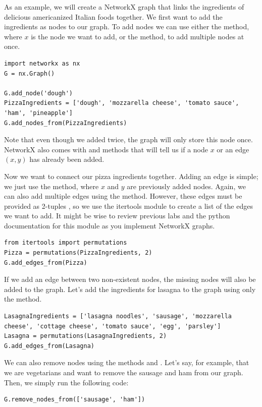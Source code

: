 As an example, we will create a NetworkX graph that links the ingredients of
delicious americanized Italian foods together. We first want to add the ingredients as nodes
to our graph. To add nodes we can use either the  method, where $x$
is the node we want to add, or the  method, to
add multiple nodes at once.

\begin{lstlisting}
import networkx as nx
G = nx.Graph()

G.add_node('dough')
PizzaIngredients = ['dough', 'mozzarella cheese', 'tomato sauce', 'ham', 'pineapple']
G.add_nodes_from(PizzaIngredients)
\end{lstlisting}
Note that even though we added  twice, the graph will only store this node once. NetworkX also comes with  and  methods that will tell
us if a node $x$ or an edge $(x,y)$ has already been added.

Now we want to connect our pizza ingredients together. Adding an edge is simple; we just use the  method, where $x$ and $y$ are previously added nodes.
Again, we can also add multiple edges using the  method.
However, these edges must be provided as 2-tuples , so we use the
itertools module to create a list of the edges we want to add. It might be wise
to review previous labs and the python documentation for this module as you implement
NetworkX graphs.

\begin{lstlisting}
from itertools import permutations
Pizza = permutations(PizzaIngredients, 2)
G.add_edges_from(Pizza)
\end{lstlisting}
If we add an edge between two non-existent nodes, the missing nodes will also be added to the graph. Let's add the ingredients for lasagna to the graph using only the  method.
\begin{lstlisting}
LasagnaIngredients = ['lasagna noodles', 'sausage', 'mozzarella cheese', 'cottage cheese', 'tomato sauce', 'egg', 'parsley']
Lasagna = permutations(LasagnaIngredients, 2)
G.add_edges_from(Lasagna)
\end{lstlisting}
We can also remove nodes using the methods  and .
Let's say, for example, that we are vegetarians and want to remove the
sausage and ham from our graph. Then, we simply run the following code:
\begin{lstlisting}
G.remove_nodes_from(['sausage', 'ham'])
\end{lstlisting}

